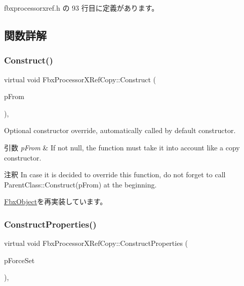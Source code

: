  fbxprocessorxref.\+h の 93 行目に定義があります。



\subsection{関数詳解}
\mbox{\label{class_fbx_processor_x_ref_copy_a025831c438813ebe4ef619ea5b00d2fd}} 
\subsubsection{\texorpdfstring{Construct()}{Construct()}}
{\footnotesize\ttfamily virtual void Fbx\+Processor\+X\+Ref\+Copy\+::\+Construct (\begin{DoxyParamCaption}\item[{const \hyperlink{class_fbx_object}{Fbx\+Object} $\ast$}]{p\+From }\end{DoxyParamCaption})\hspace{0.3cm}{\ttfamily [protected]}, {\ttfamily [virtual]}}

Optional constructor override, automatically called by default constructor. 
\begin{DoxyParams}{引数}
{\em p\+From} & If not null, the function must take it into account like a copy constructor. \\
\hline
\end{DoxyParams}
\begin{DoxyRemark}{注釈}
In case it is decided to override this function, do not forget to call Parent\+Class\+::\+Construct(p\+From) at the beginning. 
\end{DoxyRemark}


\hyperlink{class_fbx_object_a313503bc645af3fdceb4a99ef5cea7eb}{Fbx\+Object}を再実装しています。

\mbox{\label{class_fbx_processor_x_ref_copy_afccc4a20df6bee60d5ce2a7a9ca11666}} 
\subsubsection{\texorpdfstring{Construct\+Properties()}{ConstructProperties()}}
{\footnotesize\ttfamily virtual void Fbx\+Processor\+X\+Ref\+Copy\+::\+Construct\+Properties (\begin{DoxyParamCaption}\item[{bool}]{p\+Force\+Set }\end{DoxyParamCaption})\hspace{0.3cm}{\ttfamily [protected]}, {\ttfamily [virtual]}}

